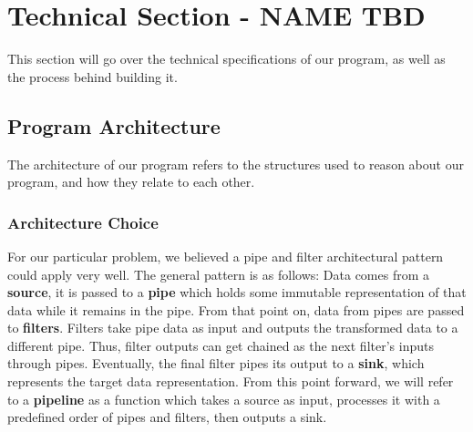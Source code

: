 \documentclass[11pt]{article}
\begin{document}
    \section{Technical Section - NAME TBD}
    This section will go over the technical specifications of our program, as well as the process behind building it.
    \subsection{Program Architecture}
    The architecture of our program refers to the structures used to reason about our program, and how they relate to each other.

    \subsubsection{Architecture Choice}
    For our particular problem, we believed a pipe and filter architectural pattern could apply very well. The general pattern is as follows: Data comes from a \textbf{source}, it is passed to a \textbf{pipe} which holds some immutable representation of that data while it remains in the pipe. From that point on, data from pipes are passed to \textbf{filters}. Filters take pipe data as input and outputs the transformed data to a different pipe. Thus, filter outputs can get chained as the next filter's inputs through pipes. Eventually, the final filter pipes its output to a \textbf{sink}, which represents the target data representation. From this point forward, we will refer to a \textbf{pipeline} as a function which takes a source as input, processes it with a predefined order of pipes and filters, then outputs a sink.\\
\end{document}
